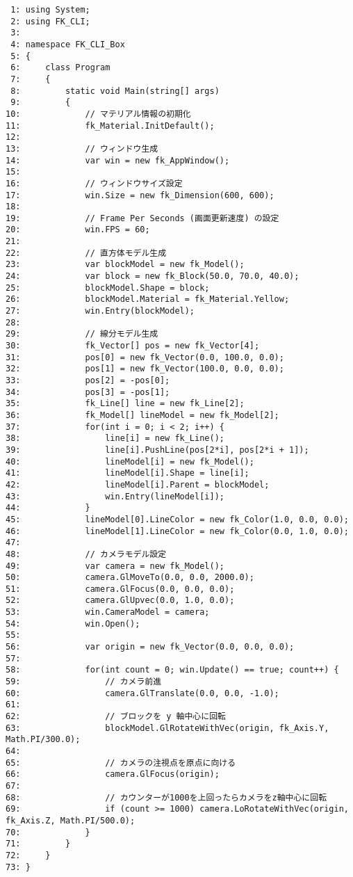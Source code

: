 \begin{breakbox}
\begin{small}
\begin{verbatim}
 1: using System;
 2: using FK_CLI;
 3: 
 4: namespace FK_CLI_Box
 5: {
 6:     class Program
 7:     {
 8:         static void Main(string[] args)
 9:         {
10:             // マテリアル情報の初期化
11:             fk_Material.InitDefault();
12: 
13:             // ウィンドウ生成
14:             var win = new fk_AppWindow();
15: 
16:             // ウィンドウサイズ設定
17:             win.Size = new fk_Dimension(600, 600);
18: 
19:             // Frame Per Seconds (画面更新速度) の設定
20:             win.FPS = 60;
21: 
22:             // 直方体モデル生成
23:             var blockModel = new fk_Model();
24:             var block = new fk_Block(50.0, 70.0, 40.0);
25:             blockModel.Shape = block;
26:             blockModel.Material = fk_Material.Yellow;
27:             win.Entry(blockModel);
28: 
29:             // 線分モデル生成
30:             fk_Vector[] pos = new fk_Vector[4];
31:             pos[0] = new fk_Vector(0.0, 100.0, 0.0);
32:             pos[1] = new fk_Vector(100.0, 0.0, 0.0);
33:             pos[2] = -pos[0];
34:             pos[3] = -pos[1];
35:             fk_Line[] line = new fk_Line[2];
36:             fk_Model[] lineModel = new fk_Model[2];
37:             for(int i = 0; i < 2; i++) {
38:                 line[i] = new fk_Line();
39:                 line[i].PushLine(pos[2*i], pos[2*i + 1]);
40:                 lineModel[i] = new fk_Model();
41:                 lineModel[i].Shape = line[i];
42:                 lineModel[i].Parent = blockModel;
43:                 win.Entry(lineModel[i]);
44:             }
45:             lineModel[0].LineColor = new fk_Color(1.0, 0.0, 0.0);
46:             lineModel[1].LineColor = new fk_Color(0.0, 1.0, 0.0);
47: 
48:             // カメラモデル設定
49:             var camera = new fk_Model();
50:             camera.GlMoveTo(0.0, 0.0, 2000.0);
51:             camera.GlFocus(0.0, 0.0, 0.0);
52:             camera.GlUpvec(0.0, 1.0, 0.0);
53:             win.CameraModel = camera;
54:             win.Open();
55: 
56:             var origin = new fk_Vector(0.0, 0.0, 0.0);
57: 
58:             for(int count = 0; win.Update() == true; count++) {
59:                 // カメラ前進
60:                 camera.GlTranslate(0.0, 0.0, -1.0);
61: 
62:                 // ブロックを y 軸中心に回転
63:                 blockModel.GlRotateWithVec(origin, fk_Axis.Y, Math.PI/300.0);
64: 
65:                 // カメラの注視点を原点に向ける
66:                 camera.GlFocus(origin);
67: 
68:                 // カウンターが1000を上回ったらカメラをz軸中心に回転
69:                 if (count >= 1000) camera.LoRotateWithVec(origin, fk_Axis.Z, Math.PI/500.0);
70:             }
71:         }
72:     }
73: }
\end{verbatim}
\end{small}
\end{breakbox}
